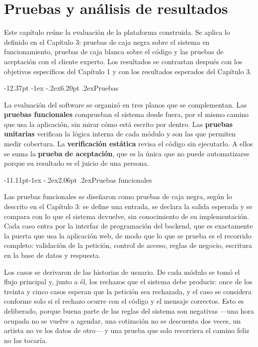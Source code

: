 \documentclass[12pt,letterpaper,oneside]{report}
\makeatletter
\renewcommand\section{\@startsection{section}{1}{\z@}%
  {-12.37pt \@plus -1ex \@minus -.2ex}{6.20pt \@plus.2ex}{\normalfont\large\bfseries}}
\renewcommand\subsection{\@startsection{subsection}{2}{\z@}%
  {-11.11pt\@plus -1ex \@minus -.2ex}{2.06pt \@plus .2ex}{\normalfont\normalsize\bfseries}}
\makeatother
\begin{document}
\chapter{Pruebas y análisis de resultados}

Este capítulo reúne la evaluación de la plataforma construida. Se aplica lo definido en el Capítulo 3: pruebas de caja negra sobre el sistema en funcionamiento, pruebas de caja blanca sobre el código y las pruebas de aceptación con el cliente experto. Los resultados se contrastan después con los objetivos específicos del Capítulo 1 y con los resultados esperados del Capítulo 3.



\section{Pruebas}

La evaluación del software se organizó en tres planos que se complementan. Las \textbf{pruebas funcionales} comprueban el sistema desde fuera, por el mismo camino que usa la aplicación, sin mirar cómo está escrito por dentro. Las \textbf{pruebas unitarias} verifican la lógica interna de cada módulo y son las que permiten medir cobertura. La \textbf{verificación estática} revisa el código sin ejecutarlo. A ellos se suma la \textbf{prueba de aceptación}, que es la única que no puede automatizarse porque su resultado es el juicio de una persona.

\subsection{Pruebas funcionales}

Las pruebas funcionales se diseñaron como pruebas de caja negra, según lo descrito en el Capítulo 3: se define una entrada, se declara la salida esperada y se compara con lo que el sistema devuelve, sin conocimiento de su implementación. Cada caso entra por la interfaz de programación del backend, que es exactamente la puerta que usa la aplicación web, de modo que lo que se prueba es el recorrido completo: validación de la petición, control de acceso, reglas de negocio, escritura en la base de datos y respuesta.

Los casos se derivaron de las historias de usuario. De cada módulo se tomó el flujo principal y, junto a él, los rechazos que el sistema debe producir: once de los treinta y cinco casos esperan que la petición sea rechazada, y el caso se considera conforme solo si el rechazo ocurre con el código y el mensaje correctos. Esto es deliberado, porque buena parte de las reglas del sistema son negativas —una hora ocupada no se vuelve a agendar, una cotización no se descuenta dos veces, un artista no ve los datos de otro— y una prueba que solo recorriera el camino feliz no las tocaría.
\end{document}
